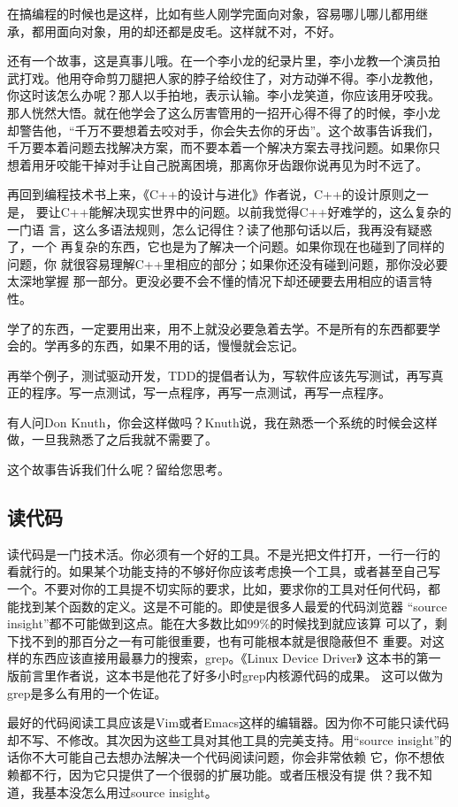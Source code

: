 \documentclass[10pt]{article}
\begin{document}
\begin{CJK*}{UTF8}{simsun}
在搞编程的时候也是这样，比如有些人刚学完面向对象，容易哪儿哪儿都用继
承，都用面向对象，用的却还都是皮毛。这样就不对，不好。

还有一个故事，这是真事儿哦。在一个李小龙的纪录片里，李小龙教一个演员拍
武打戏。他用夺命剪刀腿把人家的脖子给绞住了，对方动弹不得。李小龙教他，
你这时该怎么办呢？那人以手拍地，表示认输。李小龙笑道，你应该用牙咬我。
那人恍然大悟。就在他学会了这么厉害管用的一招开心得不得了的时候，李小龙
却警告他，“千万不要想着去咬对手，你会失去你的牙齿”。这个故事告诉我们，
千万要本着问题去找解决方案，而不要本着一个解决方案去寻找问题。如果你只
想着用牙咬能干掉对手让自己脱离困境，那离你牙齿跟你说再见为时不远了。

再回到编程技术书上来，《C++的设计与进化》作者说，C++的设计原则之一是，
要让C++能解决现实世界中的问题。以前我觉得C++好难学的，这么复杂的一门语
言，这么多语法规则，怎么记得住？读了他那句话以后，我再没有疑惑了，一个
再复杂的东西，它也是为了解决一个问题。如果你现在也碰到了同样的问题，你
就很容易理解C++里相应的部分；如果你还没有碰到问题，那你没必要太深地掌握
那一部分。更没必要不会不懂的情况下却还硬要去用相应的语言特性。

学了的东西，一定要用出来，用不上就没必要急着去学。不是所有的东西都要学
会的。学再多的东西，如果不用的话，慢慢就会忘记。

再举个例子，测试驱动开发，TDD的提倡者认为，写软件应该先写测试，再写真
正的程序。写一点测试，写一点程序，再写一点测试，再写一点程序。

有人问Don Knuth，你会这样做吗？Knuth说，我在熟悉一个系统的时候会这样
做，一旦我熟悉了之后我就不需要了。

这个故事告诉我们什么呢？留给您思考。

\subsection{读代码}

读代码是一门技术活。你必须有一个好的工具。不是光把文件打开，一行一行的
看就行的。如果某个功能支持的不够好你应该考虑换一个工具，或者甚至自己写
一个。不要对你的工具提不切实际的要求，比如，要求你的工具对任何代码，都
能找到某个函数的定义。这是不可能的。即使是很多人最爱的代码浏览器
“source insight”都不可能做到这点。能在大多数比如99\%的时候找到就应该算
可以了，剩下找不到的那百分之一有可能很重要，也有可能根本就是很隐蔽但不
重要。对这样的东西应该直接用最暴力的搜索，grep。《Linux Device Driver》
这本书的第一版前言里作者说，这本书是他花了好多小时grep内核源代码的成果。
这可以做为grep是多么有用的一个佐证。

最好的代码阅读工具应该是Vim或者Emacs这样的编辑器。因为你不可能只读代码
却不写、不修改。其次因为这些工具对其他工具的完美支持。用“source
insight”的话你不大可能自己去想办法解决一个代码阅读问题，你会非常依赖
它，你不想依赖都不行，因为它只提供了一个很弱的扩展功能。或者压根没有提
供？我不知道，我基本没怎么用过source insight。


\end{CJK*}
\end{document}
